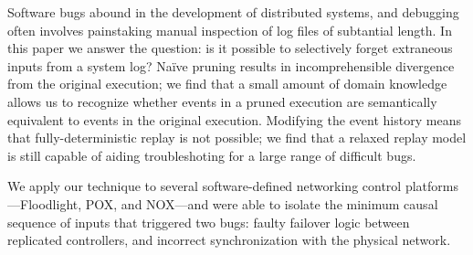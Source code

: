 Software bugs abound in the development of distributed systems, and debugging
often involves painstaking manual inspection of log files of subtantial
length. In this paper we answer the question: is it possible to
selectively forget extraneous inputs from a system log? Na\"ive pruning
results in incomprehensible divergence from the original execution; we find
that a small amount of domain knowledge allows us to recognize whether events in
a pruned execution are semantically equivalent to events in the original
execution. Modifying the event history means that fully-deterministic replay is
not possible; we find that a relaxed replay model is still capable of
aiding troubleshoting for a large range of difficult bugs.

We apply our technique to several software-defined networking control
platforms---Floodlight, POX, and NOX---and
were able to isolate the minimum causal sequence of inputs that triggered
two bugs: faulty failover logic between replicated controllers, and incorrect
synchronization with the physical network.
